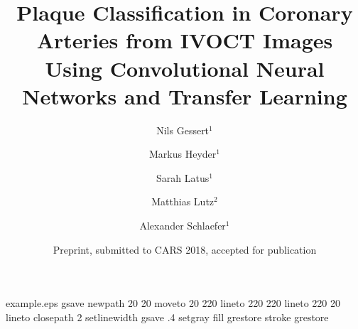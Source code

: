 \begin{filecontents*}{example.eps}
gsave
newpath
  20 20 moveto
  20 220 lineto
  220 220 lineto
  220 20 lineto
closepath
2 setlinewidth
gsave
  .4 setgray fill
grestore
stroke
grestore
\end{filecontents*}
\RequirePackage{fix-cm}
\documentclass[onecolumn,10pt]{svjour3}
\smartqed  %
\usepackage{graphicx}
\usepackage{fixltx2e}
\usepackage[misc]{ifsym}
\usepackage{float}
\usepackage[multi-part-units=single]{siunitx}
\usepackage[font=small,labelfont=bf,tableposition=top]{caption}



\title{Plaque Classification in Coronary Arteries from IVOCT Images Using Convolutional Neural Networks and Transfer Learning}



\author{Nils Gessert$^1$        \and
        Markus Heyder$^1$  \and
        Sarah Latus$^1$  \and
        Matthias Lutz$^2$ \and
        Alexander Schlaefer$^1$  %
}



\date{Preprint, submitted to CARS 2018, accepted for publication}


\maketitle

\begin{abstract}

Advanced atherosclerosis in the coronary arteries is one of the leading causes of deaths worldwide while being preventable and treatable. In order to image atherosclerotic lesions (plaque), intravascular optical coherence tomography (IVOCT) can be used. The technique provides high-resolution images of arterial walls which allows for early plaque detection by experts. Due to the vast amount of IVOCT images acquired in clinical routines, automatic plaque detection has been addressed. For example, attenuation profiles in single A-Scans of IVOCT images are examined to detect plaque. We address automatic plaque classification from entire IVOCT images, the cross-sectional view of the artery, using deep feature learning. In this way, we take context between A-Scans into account and we directly learn relevant features from the image source without the need for handcrafting features.

\end{abstract}

